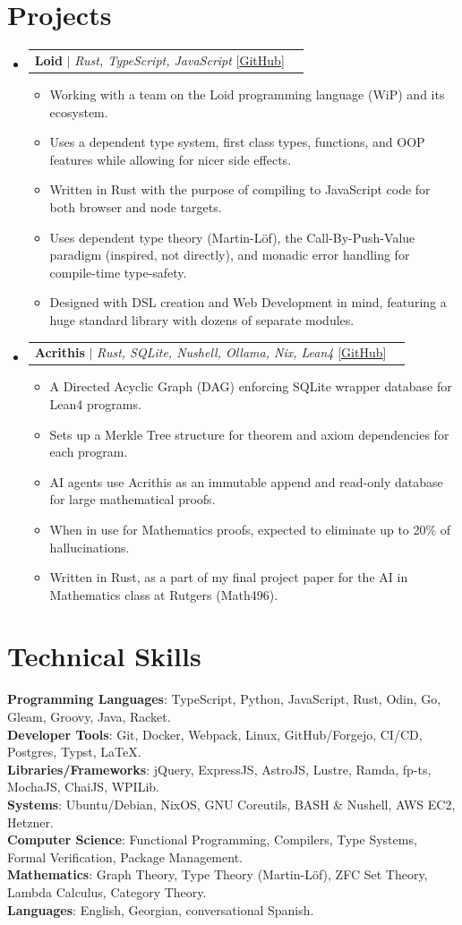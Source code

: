 \documentclass[letterpaper,11pt]{article}
\makeatletter
\newcommand{\resumeItem}[1]{
  \item\small{
    {#1 \vspace{-2pt}}
  }
}
\newcommand{\resumeProjectHeading}[2]{%
    \par\prevdepth=-1000pt
    \item
    \begin{tabular*}{0.97\textwidth}{l@{\extracolsep{\fill}}r}
      \small#1 & #2 \\
    \end{tabular*}\vspace{-7pt}%
}
\newcommand{\resumeSubHeadingListStart}{\begin{itemize}[leftmargin=0.15in, label={}]}
\newcommand{\resumeSubHeadingListEnd}{\end{itemize}}
\newcommand{\resumeItemListStart}{\begin{itemize}}
\newcommand{\resumeItemListEnd}{\end{itemize}\vspace{-5pt}}
\makeatother
\begin{document}
\section{Projects}
  \resumeSubHeadingListStart
  \resumeProjectHeading
  {\textbf{Loid} $|$ \emph{Rust, TypeScript, JavaScript} [\href{https://github.com/Loid-Project/loid}{\underline{GitHub}}]}{}
\resumeItemListStart
  \resumeItem{Working with a team on the Loid programming language (WiP) and its ecosystem.}
  \resumeItem{Uses a dependent type system, first class types, functions, and OOP features while allowing for nicer side effects.}
  \resumeItem{Written in Rust with the purpose of compiling to JavaScript code for both browser and node targets.}
  \resumeItem{Uses dependent type theory (Martin-Löf), the Call-By-Push-Value paradigm (inspired, not directly), and monadic error handling for compile-time type-safety.}
  \resumeItem{Designed with DSL creation and Web Development in mind, featuring a huge standard library with dozens of separate modules.}
\resumeItemListEnd
 \resumeProjectHeading
  {\textbf{Acrithis} $|$ \emph{Rust, SQLite, Nushell, Ollama, Nix, Lean4} [\href{https://github.com/givikuna/acrithis}{\underline{GitHub}}]}{}
\resumeItemListStart
  \resumeItem{A Directed Acyclic Graph (DAG) enforcing SQLite wrapper database for Lean4 programs.}
  \resumeItem{Sets up a Merkle Tree structure for theorem and axiom dependencies for each program.}
  \resumeItem{AI agents use Acrithis as an immutable append and read-only database for large mathematical proofs.}
  \resumeItem{When in use for Mathematics proofs, expected to eliminate up to 20\% of hallucinations.}
  \resumeItem{Written in Rust, as a part of my final project paper for the AI in Mathematics class at Rutgers (Math496).}
\resumeItemListEnd
  \resumeSubHeadingListEnd

\section{Technical Skills}
 \begin{itemize}[leftmargin=0.15in, label={}]
    \small{\item{
     \textbf{Programming Languages}{: TypeScript, Python, JavaScript, Rust, Odin, Go, Gleam, Groovy, Java, Racket.} \\
     \textbf{Developer Tools}{: Git, Docker, Webpack, Linux, GitHub/Forgejo, CI/CD, Postgres, Typst, LaTeX.} \\
     \textbf{Libraries/Frameworks}{: jQuery, ExpressJS, AstroJS, Lustre, Ramda, fp-ts, MochaJS, ChaiJS, WPILib.} \\
     \textbf{Systems}{: Ubuntu/Debian, NixOS, GNU Coreutils, BASH \& Nushell, AWS EC2, Hetzner.} \\
     \textbf{Computer Science}{: Functional Programming, Compilers, Type Systems, Formal Verification, Package Management.} \\
     \textbf{Mathematics}{: Graph Theory, Type Theory (Martin-Löf), ZFC Set Theory, Lambda Calculus, Category Theory.} \\
     \textbf{Languages}{: English, Georgian, conversational Spanish.}
    }}
 \end{itemize}
\end{document}
